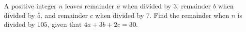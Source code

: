 A positive integer $n$ leaves remainder $a$ when divided by $3$, remainder $b$ when divided by $5$, and remainder $c$ when divided by $7$. Find the remainder when $n$ is divided by $105$, given that $4a+3b+2c=30$.
